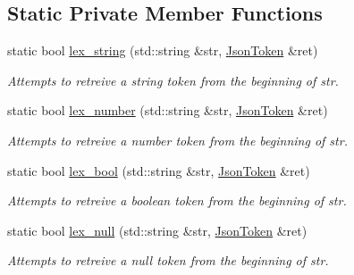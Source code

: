 \subsection*{Static Private Member Functions}
\begin{DoxyCompactItemize}
\item 
\mbox{\label{classnta_1_1utils_1_1Json_a085ef4e12b6ac83ef239425037b5bf73}} 
static bool \hyperlink{classnta_1_1utils_1_1Json_a085ef4e12b6ac83ef239425037b5bf73}{lex\+\_\+string} (std\+::string \&str, \hyperlink{structnta_1_1utils_1_1Json_1_1JsonToken}{Json\+Token} \&ret)
\begin{DoxyCompactList}\small\item\em Attempts to retreive a string token from the beginning of str. \end{DoxyCompactList}\item 
\mbox{\label{classnta_1_1utils_1_1Json_a85d932ecf9fc69f93af5da7349a8e265}} 
static bool \hyperlink{classnta_1_1utils_1_1Json_a85d932ecf9fc69f93af5da7349a8e265}{lex\+\_\+number} (std\+::string \&str, \hyperlink{structnta_1_1utils_1_1Json_1_1JsonToken}{Json\+Token} \&ret)
\begin{DoxyCompactList}\small\item\em Attempts to retreive a number token from the beginning of str. \end{DoxyCompactList}\item 
\mbox{\label{classnta_1_1utils_1_1Json_af563232c6a9334fe69f05ae33ee76573}} 
static bool \hyperlink{classnta_1_1utils_1_1Json_af563232c6a9334fe69f05ae33ee76573}{lex\+\_\+bool} (std\+::string \&str, \hyperlink{structnta_1_1utils_1_1Json_1_1JsonToken}{Json\+Token} \&ret)
\begin{DoxyCompactList}\small\item\em Attempts to retreive a boolean token from the beginning of str. \end{DoxyCompactList}\item 
\mbox{\label{classnta_1_1utils_1_1Json_aea0272293c585f0d30811afe6a43917b}} 
static bool \hyperlink{classnta_1_1utils_1_1Json_aea0272293c585f0d30811afe6a43917b}{lex\+\_\+null} (std\+::string \&str, \hyperlink{structnta_1_1utils_1_1Json_1_1JsonToken}{Json\+Token} \&ret)
\begin{DoxyCompactList}\small\item\em Attempts to retreive a null token from the beginning of str. \end{DoxyCompactList}\item 

\end{DoxyCompactItemize}
